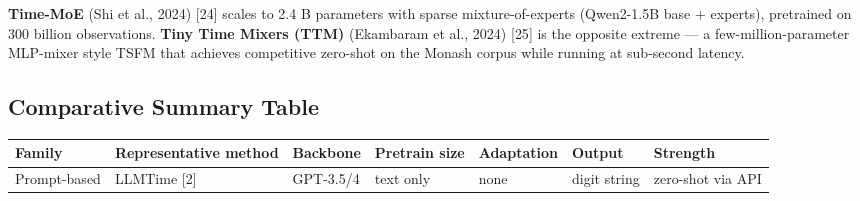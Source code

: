 \textbf{Time-MoE} (Shi et al., 2024) {[}24{]} scales to 2.4 B parameters with sparse mixture-of-experts (Qwen2-1.5B base + experts), pretrained on 300 billion observations. \textbf{Tiny Time Mixers (TTM)} (Ekambaram et al., 2024) {[}25{]} is the opposite extreme --- a few-million-parameter MLP-mixer style TSFM that achieves competitive zero-shot on the Monash corpus while running at sub-second latency.

\subsection{Comparative Summary Table}\label{comparative-summary-table}

{\def\LTcaptype{none} %
\begin{longtable}[]{@{}
  >{\raggedright\arraybackslash}p{}
  >{\raggedright\arraybackslash}p{}
  >{\raggedright\arraybackslash}p{}
  >{\raggedright\arraybackslash}p{}
  >{\raggedright\arraybackslash}p{}
  >{\raggedright\arraybackslash}p{}
  >{\raggedright\arraybackslash}p{}@{}}
\toprule\noalign{}
\begin{minipage}[b]{\linewidth}\raggedright
Family
\end{minipage} & \begin{minipage}[b]{\linewidth}\raggedright
Representative method
\end{minipage} & \begin{minipage}[b]{\linewidth}\raggedright
Backbone
\end{minipage} & \begin{minipage}[b]{\linewidth}\raggedright
Pretrain size
\end{minipage} & \begin{minipage}[b]{\linewidth}\raggedright
Adaptation
\end{minipage} & \begin{minipage}[b]{\linewidth}\raggedright
Output
\end{minipage} & \begin{minipage}[b]{\linewidth}\raggedright
Strength
\end{minipage} \\
\midrule\noalign{}
\endhead
\bottomrule\noalign{}
\endlastfoot
Prompt-based & LLMTime {[}2{]} & GPT-3.5/4 & text only & none & digit string & zero-shot via API \\

\end{longtable}}
